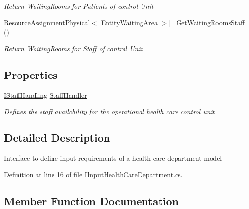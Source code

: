 \begin{DoxyCompactItemize}
\begin{DoxyCompactList}\small\item\em Return Waiting\+Rooms for Patients of control Unit \end{DoxyCompactList}\item 
\hyperlink{class_general_health_care_elements_1_1_resource_handling_1_1_resource_assignment_physical}{Resource\+Assignment\+Physical}$<$ \hyperlink{class_general_health_care_elements_1_1_entities_1_1_entity_waiting_area}{Entity\+Waiting\+Area} $>$\mbox{[}$\,$\mbox{]} \hyperlink{interface_general_health_care_elements_1_1_input_1_1_i_input_health_care_department_a15eaa2bdfff148a314bcd071b3b75163}{Get\+Waiting\+Rooms\+Staff} ()
\begin{DoxyCompactList}\small\item\em Return Waiting\+Rooms for Staff of control Unit \end{DoxyCompactList}\end{DoxyCompactItemize}
\subsection*{Properties}
\begin{DoxyCompactItemize}
\item 
\hyperlink{interface_general_health_care_elements_1_1_staff_handling_1_1_i_staff_handling}{I\+Staff\+Handling} \hyperlink{interface_general_health_care_elements_1_1_input_1_1_i_input_health_care_department_a7d94c929fbca7b3cfd924f63a661bdbc}{Staff\+Handler}
\begin{DoxyCompactList}\small\item\em Defines the staff availability for the operational health care control unit \end{DoxyCompactList}\end{DoxyCompactItemize}


\subsection{Detailed Description}
Interface to define input requirements of a health care department model 



Definition at line 16 of file I\+Input\+Health\+Care\+Department.\+cs.



\subsection{Member Function Documentation}
